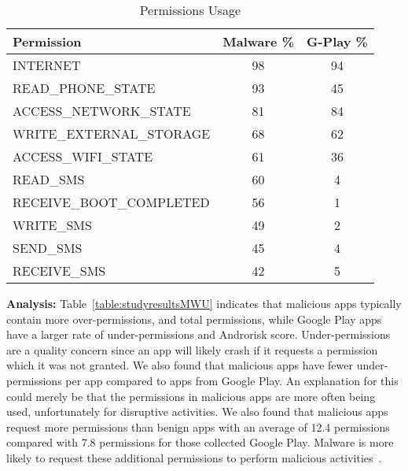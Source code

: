 \documentclass{sig-alternate-05-2015}
\begin{document}
\begin{table}[h]
\center
\caption{Permissions Usage}
\label{Table:permissions_usage}
 \begin{tabular}{ | l | c | c | } \hline

  \bfseries Permission & \bfseries Malware \%& \bfseries G-Play \%\\ \hline

	INTERNET	& 98 &	94 \\ \hline
	READ\_PHONE\_STATE	& 93 &	45 \\ \hline
	ACCESS\_NETWORK\_STATE	 & 81 &	84 \\ \hline
	WRITE\_EXTERNAL\_STORAGE &	68 &	62 \\ \hline
	ACCESS\_WIFI\_STATE &	61 &	36 \\ \hline
	READ\_SMS &	60 & 	4 \\ \hline
	RECEIVE\_BOOT\_COMPLETED &	56 & 1 \\ \hline
	WRITE\_SMS &	49 &	2 \\ \hline
	SEND\_SMS &	45 &	4 \\ \hline
	RECEIVE\_SMS &	42 &	5 \\ \hline


  \end{tabular}
\end{table}

\noindent
\textbf{Analysis:} Table~\ref{table:studyresultsMWU} indicates that malicious apps typically contain more over-permissions, and total permissions, while Google Play apps have a larger rate of under-permissions and Androrisk score. Under-permissions are a quality concern since an app will likely crash if it requests a permission which it was not granted. We also found that malicious apps have fewer under-permissions per app compared to apps from Google Play. An explanation for this could merely be that the permissions in malicious apps are more often being used, unfortunately for disruptive activities. We also found that malicious apps request more permissions than benign apps with an average of 12.4 permissions compared with 7.8 permissions for those collected Google Play. Malware is more likely to request these additional permissions to perform malicious activities~\cite{Sarma:2012:APP:2295136.2295141}.

\end{document}
